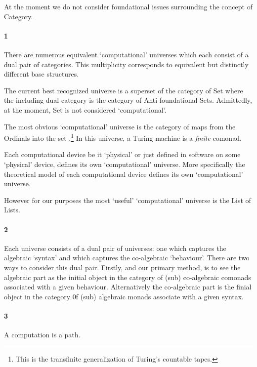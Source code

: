 
At the moment we do not consider foundational issues surrounding the concept of Category.

\paragraph{1}

There are numerous equivalent `computational' universes which each consist of a
dual pair of categories. This multiplicity corresponds to equivalent but
distinctly different base structures.

The current best recognized universe is a superset of the category of Set where
the including dual category is the category of Anti-foundational Sets.
Admittedly, at the moment, Set is not considered `computational'.

The most obvious `computational' universe is the category of maps from the
Ordinals into the set .\footnote{This is the
transfinite generalization of Turing's countable tapes.} In this universe, a
Turing machine is a \emph{finite} comonad.

Each computational device be it `physical' or just defined in software on some
`physical' device, defines its own `computational' universe. More specifically
the theoretical model of each computational device defines its own
`computational' universe.

However for our purposes the most `useful' `computational' universe is the List of Lists.

\paragraph{2}

Each universe consists of a dual pair of universes: one which captures the
algebraic `syntax' and which captures the co-algebraic `behaviour'. There are
two ways to consider this dual pair. Firstly, and our primary method, is to see
the algebraic part as the initial object in the category of (sub) co-algebraic
comonads associated with a given behaviour. Alternatively the co-algebraic part
is the finial object in the category 0f (sub) algebraic monads associate with a
given syntax.

\paragraph{3}

A computation is a path.

